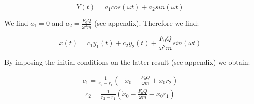 \begin{equation*}
	Y(t) = a_1 cos(\omega t) + a_2 sin(\omega t)
\end{equation*}

We find $a_1 = 0$ and $a_2 = \frac{F_0 Q}{\omega^2 m}$ (see appendix). Therefore we find:

\begin{equation*}
	x(t) = c_1 y_1(t) + c_2 y_2(t) + \frac{F_0 Q}{\omega^2 m}sin(\omega t)
\end{equation*}

By imposing the initial conditions on the latter result (see appendix) we obtain:

\begin{align*}
	c_1 = \frac{1}{r_2-r_1} \left( -\dot{x}_0 + \frac{F_0 Q}{\omega m} + x_0 r_2 \right)
\end{align*}
\begin{align*}
	c_2 = \frac{1}{r_2-r_1} \left( \dot{x}_0 - \frac{F_0 Q}{\omega m} - x_0 r_1 \right) \\
\end{align*}














